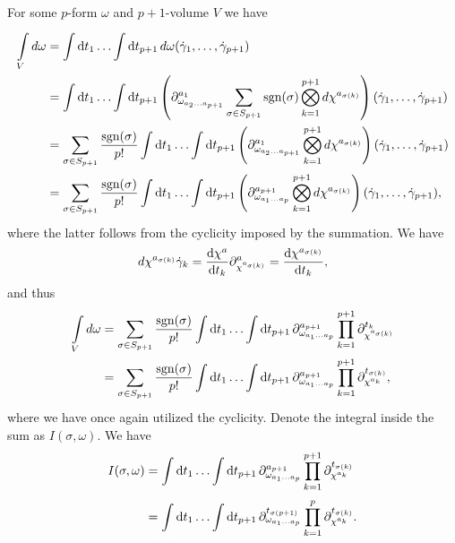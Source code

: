 For some $p$-form $\omega$ and $p + 1$-volume $V$ we have
\begin{align*}
	\inte{V}{}\df{\omega} &= \inte{}{}\dd{t_{1}}{\dots \inte{}{}\dd{t_{p + 1}}{d\omega(\dot{\gamma}_{1},\dots, \dot{\gamma}_{p + 1})}} \\
	                      &= \inte{}{}\dd{t_{1}}{\dots \inte{}{}\dd{t_{p + 1}}{\left(\del{a_{1}}{\omega_{a_{2}\dots a_{p + 1}}}\sum\limits_{\sigma\in S_{p + 1}}\text{sgn}(\sigma)\bigotimes_{k = 1}^{p + 1}d\chi^{a_{\sigma(k)}}\right)(\dot{\gamma}_{1},\dots, \dot{\gamma}_{p + 1})}} \\
	                      &= \sum\limits_{\sigma\in S_{p + 1}}\frac{\text{sgn}(\sigma)}{p!}\inte{}{}\dd{t_{1}}{\dots \inte{}{}\dd{t_{p + 1}}{\left(\del{a_{1}}{\omega_{a_{2}\dots a_{p + 1}}}\bigotimes_{k = 1}^{p + 1}d\chi^{a_{\sigma(k)}}\right)(\dot{\gamma}_{1},\dots, \dot{\gamma}_{p + 1})}} \\
	                      &= \sum\limits_{\sigma\in S_{p + 1}}\frac{\text{sgn}(\sigma)}{p!}\inte{}{}\dd{t_{1}}{\dots \inte{}{}\dd{t_{p + 1}}{\left(\del{a_{p + 1}}{\omega_{a_{1}\dots a_{p}}}\bigotimes_{k = 1}^{p + 1}d\chi^{a_{\sigma(k)}}\right)(\dot{\gamma}_{1},\dots, \dot{\gamma}_{p + 1})}},
\end{align*}
where the latter follows from the cyclicity imposed by the summation. We have
\begin{align*}
d\chi^{a_{\sigma(k)}}{\dot{\gamma}_{k}} = \dv{\chi^{a}}{t_{k}}\partial^{a}_{\chi^{a_{\sigma(k)}}} = \dv{\chi^{a_{\sigma(k)}}}{t_{k}},
\end{align*}
and thus
\begin{align*}
	\inte{V}{}\df{\omega} &= \sum\limits_{\sigma\in S_{p + 1}}\frac{\text{sgn}(\sigma)}{p!}\inte{}{}\dd{t_{1}}{\dots \inte{}{}\dd{t_{p + 1}}{\del{a_{p + 1}}{\omega_{a_{1}\dots a_{p}}}\prod\limits_{k = 1}^{p + 1}\del{t_{k}}{\chi^{a_{\sigma(k)}}}}} \\
	                      &= \sum\limits_{\sigma\in S_{p + 1}}\frac{\text{sgn}(\sigma)}{p!}\inte{}{}\dd{t_{1}}{\dots \inte{}{}\dd{t_{p + 1}}{\del{a_{p + 1}}{\omega_{a_{1}\dots a_{p}}}\prod\limits_{k = 1}^{p + 1}\del{t_{\sigma(k)}}{\chi^{a_{k}}}}},
\end{align*}
where we have once again utilized the cyclicity. Denote the integral inside the sum as $I(\sigma, \omega)$. We have
\begin{align*}
	I(\sigma, \omega) &= \inte{}{}\dd{t_{1}}{\dots \inte{}{}\dd{t_{p + 1}}{\del{a_{p + 1}}{\omega_{a_{1}\dots a_{p}}}\prod\limits_{k = 1}^{p + 1}\del{t_{\sigma(k)}}{\chi^{a_{k}}}}} \\
	                  &= \inte{}{}\dd{t_{1}}{\dots \inte{}{}\dd{t_{p + 1}}{\del{t_{\sigma(p + 1)}}{\omega_{a_{1}\dots a_{p}}}\prod\limits_{k = 1}^{p}\del{t_{\sigma(k)}}{\chi^{a_{k}}}}}.
\end{align*}
